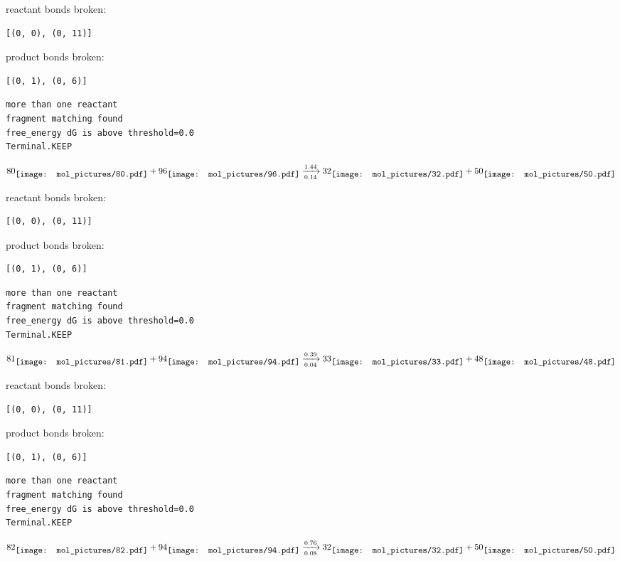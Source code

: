 \documentclass{article}
\begin{document}
reactant bonds broken:\begin{verbatim}
[(0, 0), (0, 11)]
\end{verbatim}
product bonds broken:\begin{verbatim}
[(0, 1), (0, 6)]
\end{verbatim}




\vspace{1cm}
\begin{verbatim}
more than one reactant
fragment matching found
free_energy dG is above threshold=0.0
Terminal.KEEP
\end{verbatim}
$$
80
\raisebox{-.5\height}{\texttt{[image: mol\_pictures/80.pdf]}}
+
96
\raisebox{-.5\height}{\texttt{[image: mol\_pictures/96.pdf]}}
\xrightarrow[0.14]{1.44}
32
\raisebox{-.5\height}{\texttt{[image: mol\_pictures/32.pdf]}}
+
50
\raisebox{-.5\height}{\texttt{[image: mol\_pictures/50.pdf]}}
$$


reactant bonds broken:\begin{verbatim}
[(0, 0), (0, 11)]
\end{verbatim}
product bonds broken:\begin{verbatim}
[(0, 1), (0, 6)]
\end{verbatim}




\vspace{1cm}
\begin{verbatim}
more than one reactant
fragment matching found
free_energy dG is above threshold=0.0
Terminal.KEEP
\end{verbatim}
$$
81
\raisebox{-.5\height}{\texttt{[image: mol\_pictures/81.pdf]}}
+
94
\raisebox{-.5\height}{\texttt{[image: mol\_pictures/94.pdf]}}
\xrightarrow[0.04]{0.39}
33
\raisebox{-.5\height}{\texttt{[image: mol\_pictures/33.pdf]}}
+
48
\raisebox{-.5\height}{\texttt{[image: mol\_pictures/48.pdf]}}
$$


reactant bonds broken:\begin{verbatim}
[(0, 0), (0, 11)]
\end{verbatim}
product bonds broken:\begin{verbatim}
[(0, 1), (0, 6)]
\end{verbatim}




\vspace{1cm}
\begin{verbatim}
more than one reactant
fragment matching found
free_energy dG is above threshold=0.0
Terminal.KEEP
\end{verbatim}
$$
82
\raisebox{-.5\height}{\texttt{[image: mol\_pictures/82.pdf]}}
+
94
\raisebox{-.5\height}{\texttt{[image: mol\_pictures/94.pdf]}}
\xrightarrow[0.08]{0.76}
32
\raisebox{-.5\height}{\texttt{[image: mol\_pictures/32.pdf]}}
+
50
\raisebox{-.5\height}{\texttt{[image: mol\_pictures/50.pdf]}}
$$
\end{document}
